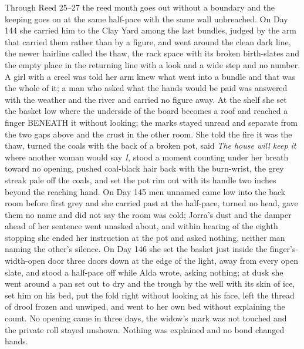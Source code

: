 \documentclass{design/chronicle}
\begin{document}
{Through Reed 25–27 the reed month goes out without a boundary and the keeping goes on at the same half-pace with the same wall unbreached. On Day 144 she carried him to the Clay Yard among the last bundles, judged by the arm that carried them rather than by a figure, and went around the clean dark line, the newer hairline called the thaw, the rack space with its broken birth-slates and the empty place in the returning line with a look and a wide step and no number. A girl with a creel was told her arm knew what went into a bundle and that was the whole of it; a man who asked what the hands would be paid was answered with the weather and the river and carried no figure away. At the shelf she set the basket low where the underside of the board becomes a roof and reached a finger BENEATH it without looking; the marks stayed unread and separate from the two gaps above and the crust in the other room. She told the fire it was the thaw, turned the coals with the back of a broken pot, said \emph{The house will keep it} where another woman would say \emph{I}, stood a moment counting under her breath toward no opening, pushed coal-black hair back with the burn-wrist, the grey streak pale off the coals, and set the pot rim out with its handle two inches beyond the reaching hand. On Day 145 men unnamed came low into the back room before first grey and she carried past at the half-pace, turned no head, gave them no name and did not say the room was cold; Jorra’s dust and the damper ahead of her sentence went unasked about, and within hearing of the eighth stopping she ended her instruction at the pot and asked nothing, neither man naming the other’s silence. On Day 146 she set the basket just inside the finger’s-width-open door three doors down at the edge of the light, away from every open slate, and stood a half-pace off while Alda wrote, asking nothing; at dusk she went around a pan set out to dry and the trough by the well with its skin of ice, set him on his bed, put the fold right without looking at his face, left the thread of drool frozen and unwiped, and went to her own bed without explaining the count. No opening came in three days, the widow’s mark was not touched and the private roll stayed unshown. Nothing was explained and no bond changed hands.

}
\end{document}

